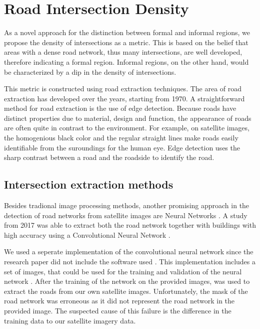 \section{Road Intersection Density}

%

As a novel approach for the distinction between formal and informal regions, we
propose the density of intersections as a metric. This is based on the belief that
areas with a dense road network, thus many intersections, are well
developed, therefore indicating a formal region. Informal regions, on the other
hand, would be characterized by a dip in the density of intersections.  

This metric is constructed using road extraction techniques. The area of road
extraction has developed over the years, starting from 1970. A straightforward
method for road extraction is the use of edge detection. Because roads have
distinct properties due to material, design and function, the appearance of
roads are often quite in contrast to the environment. For example, on satellite
images, the homogenious black color and the regular straight lines make
roads easily identifiable from the suroundings for the human eye. Edge
detection uses the sharp contrast between a road and the roadside to identify
the road.


\subsection{Intersection extraction methods}

Besides tradional image processing methods, another promising approach in the
detection of road networks from satellite images are Neural Networks
\cite{mangala2011extraction} \cite{mokhtarzade2007road}. A study from 2017 was
able to extract both the road network together with buildings with high
accuracy using a Convolutional Neural Network \cite{alshehhi2017simultaneous}.

We used a seperate implementation of the convolutional neural network since the
research paper did not include the software used \cite{airs}. This
implementation includes a set of images, that could be used for the training
and validation of the neural network \cite{MnihThesis}. After the training of
the network on the provided images, was used to extract the roads from our own
satellite images.  Unfortunately, the mask of the road network was erroneous as
it did not represent the road network in the provided image. The suspected
cause of this failure is the difference in the training data to our satellite
imagery data.

